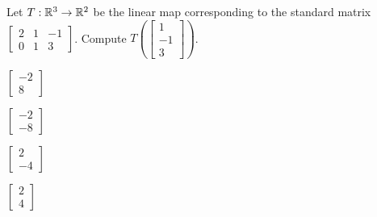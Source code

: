 \begin{readinessAssuranceTest}
\item Let \(T: \mathbb{R}^3 \rightarrow \mathbb{R}^2\) be the linear map corresponding to the standard matrix \(\begin{bmatrix} 2 & 1 & -1 \\ 0 & 1 & 3  \end{bmatrix} \).  Compute \(T\left(\begin{bmatrix} 1 \\ -1 \\ 3 \end{bmatrix} \right)\).
\begin{multicols}{4}
\begin{readinessAssuranceTestChoices}
\item $\begin{bmatrix}  -2 \\ 8 \end{bmatrix}$ %
\item $\begin{bmatrix} -2 \\ -8  \end{bmatrix}$
\item $\begin{bmatrix} 2 \\ -4 \end{bmatrix}$
\item $\begin{bmatrix}  2 \\ 4 \end{bmatrix}$ 
\end{readinessAssuranceTestChoices}
\end{multicols}


\end{readinessAssuranceTest}
